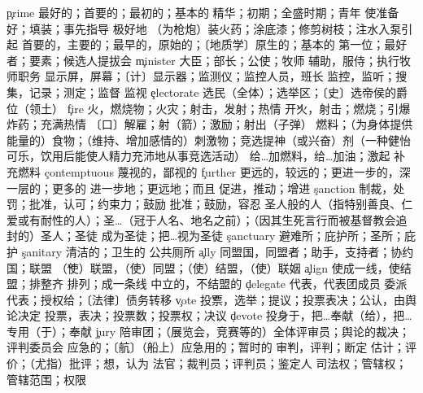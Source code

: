 \begin{multicols}{2}
\c{prime}  \a 最好的；首要的；最初的；基本的 \n 精华；初期；全盛时期；青年 \vt 使准备好；填装；事先指导 \ad 极好地 \vi （为枪炮）装火药；涂底漆；修剪树枝；注水入泵引起 
  \a 首要的，主要的；最早的，原始的；〔地质学〕原生的；基本的 \n 第一位；最好者；要素；候选人提拔会
\c{minister}  \n 大臣；部长；公使；牧师 \vi 辅助，服侍；执行牧师职务
  \n 显示屏，屏幕；〔计〕显示器；监测仪；监控人员，班长 \vt 监控，监听；搜集，记录；测定；监督 \vi 监视
\c{electorate}  \n 选民（全体）；选举区；〔史〕选帝侯的爵位（领土）
\c{fire}  \n 火，燃烧物；火灾；射击，发射；热情 \v 开火，射击；燃烧；引爆炸药；充满热情 \vt 〔口〕解雇；射（箭）；激励；射出（子弹）
  \n 燃料；（为身体提供能量的）食物；（维持、增加感情的）刺激物；竞选提神（或兴奋）剂（一种健怡可乐，饮用后能使人精力充沛地从事竞选活动） \vt 给…加燃料，给…加油；激起 \vi 补充燃料
\c{contemptuous}  \a 蔑视的，鄙视的
\c{further}  \a 更远的，较远的；更进一步的，深一层的；更多的 \ad 进一步地；更远地；而且 \vt 促进，推动；增进
\c{sanction}  \n 制裁，处罚；批准，认可；约束力；鼓励 \vt 批准；鼓励，容忍
  \n 圣人般的人（指特别善良、仁爱或有耐性的人）；圣…（冠于人名、地名之前）；（因其生死言行而被基督教会追封的）圣人；圣徒 \vt 成为圣徒；把…视为圣徒
\c{sanctuary}  \n 避难所；庇护所；圣所；庇护
\c{sanitary}  \a 清洁的；卫生的 \n 公共厕所
\c{ally}  \n 同盟国，同盟者；助手，支持者；协约国；联盟 \v （使）联盟，（使）同盟；（使）结盟，（使）联姻
\c{align}  \vt 使成一线，使结盟；排整齐 \vi 排列；成一条线
  \a 中立的，不结盟的
\c{delegate}  \n 代表，代表团成员 \vt 委派代表；授权给；〔法律〕债务转移
\c{vote}  \v 投票，选举；提议；投票表决；公认，由舆论决定 \n 投票，表决；投票数；投票权；决议 
\c{devote}  \vt 投身于，把…奉献（给），把…专用（于）；奉献 
\c{jury}  \n 陪审团；（展览会，竞赛等的）全体评审员；舆论的裁决；评判委员会 \a 应急的；〔航〕（船上）应急用的；暂时的
  \v 审判，评判；断定 \vt 估计；评价；（尤指）批评；想，认为 \n 法官；裁判员；评判员；鉴定人
  \n 司法权；管辖权；管辖范围；权限



\end{multicols}

